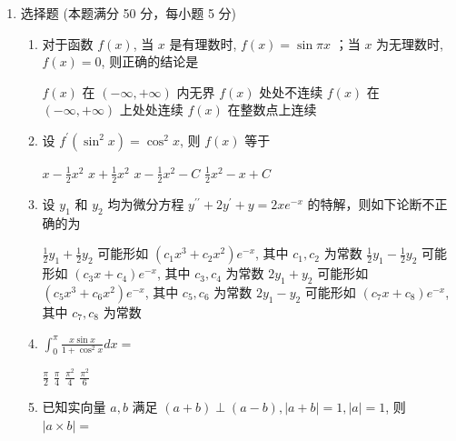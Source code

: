 
\begin{enumerate}
	\item
	选择题 (本题满分 50 分，每小题 5 分)
	\begin{enumerate}
		\item
		对于函数 $f(x)$, 当 $x$ 是有理数时, $f(x)=\sin \pi x$ ；当 $x$ 为无理数时, $f(x)=0$, 则正确的结论是 


\fourchoices
{$f(x)$ 在 $(-\infty,+\infty)$ 内无界}
{$f(x)$ 处处不连续}
{$f(x)$ 在 $(-\infty,+\infty)$ 上处处连续}
{$f(x)$ 在整数点上连续}

\item
设 $f^{\prime}\left(\sin ^{2} x\right)=\cos ^{2} x$, 则 $f(x)$ 等于 


\fourchoices
{$x-\frac{1}{2} x^{2}$}
{$x+\frac{1}{2} x^{2}$}
{$x-\frac{1}{2} x^{2}-C$}
{$\frac{1}{2} x^{2}-x+C$}

\item
设 $y_{1}$ 和 $y_{2}$ 均为微分方程 $y^{\prime \prime}+2 y^{\prime}+y=2 x e^{-x}$ 的特解，则如下论断不正确的为 


\fourchoices
{$\frac{1}{2} y_{1}+\frac{1}{2} y_{2}$ 可能形如 $\left(c_{1} x^{3}+c_{2} x^{2}\right) e^{-x}$, 其中 $c_{1}, c_{2}$ 为常数}
{$\frac{1}{2} y_{1}-\frac{1}{2} y_{2}$ 可能形如 $\left(c_{3} x+c_{4}\right) e^{-x}$, 其中 $c_{3}, c_{4}$ 为常数}
{$2 y_{1}+y_{2}$ 可能形如 $\left(c_{5} x^{3}+c_{6} x^{2}\right) e^{-x}$, 其中 $c_{5}, c_{6}$ 为常数}
{$2 y_{1}-y_{2}$ 可能形如 $\left(c_{7} x+c_{8}\right) e^{-x}$, 其中 $c_{7}, c_{8}$ 为常数}


\item
$ \int_{0}^{\pi} \frac{x \sin x}{1+\cos ^{2} x} d x= $ 


\fourchoices
{$\frac{\pi}{2}$}
{$\frac{\pi}{4}$}
{$\frac{\pi^{2}}{4}$}
{$\frac{\pi^{2}}{6}$}

\item
已知实向量 $a, b$ 满足 $(a+b) \perp(a-b),|a+b|=1,|a|=1$, 则 $|a \times b|=$ 



\end{enumerate}
\end{enumerate}
